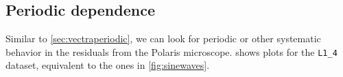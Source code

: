 \documentclass{article}
\begin{document}
\subsection{Periodic dependence}
\label{sec:JHUpolarisperiodic}

Similar to \cref{sec:vectraperiodic}, we can look for periodic or other systematic behavior in the residuals from the Polaris microscope.   shows plots for the \texttt{L1\_4} dataset, equivalent to the ones in \cref{fig:sinewaves}.


\end{document}
